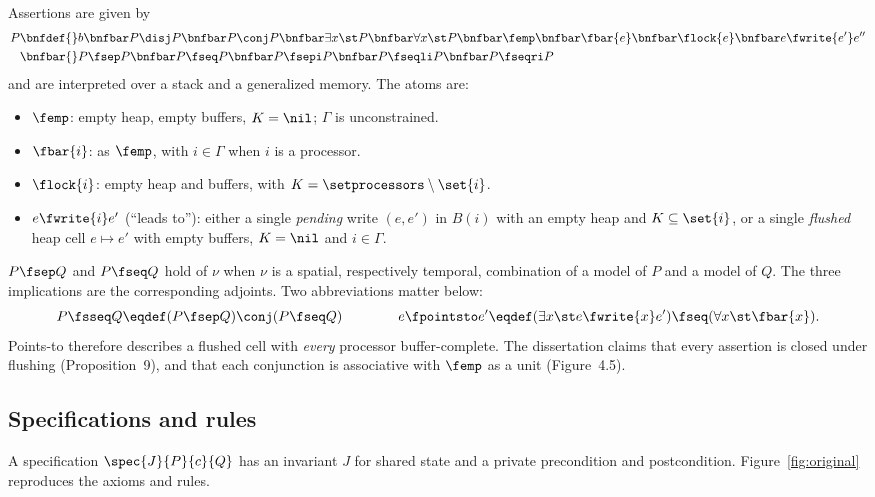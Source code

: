Assertions are given by
\begin{align*}
  P \bnfdef{} & b \bnfbar P \disj P \bnfbar P \conj P \bnfbar \exists x \st P
    \bnfbar \forall x \st P \bnfbar \femp \bnfbar \fbar{e} \bnfbar
    \flock{e} \bnfbar e \fwrite{e'} e'' \\
  \bnfbar{} & P \fsep P \bnfbar P \fseq P \bnfbar P \fsepi P \bnfbar
    P \fseqli P \bnfbar P \fseqri P
\end{align*}
and are interpreted over a stack and a generalized memory. The atoms are:
\begin{itemize}[nosep]
  \item $\femp$: empty heap, empty buffers, $K = \nil$; $\Gamma$ is
        unconstrained.
  \item $\fbar{i}$: as $\femp$, with $i \in \Gamma$ when $i$ is a processor.
  \item $\flock{i}$: empty heap and buffers, with
        $K = \setprocessors \setminus \set{i}$.
  \item $e \fwrite{i} e'$ (``leads to''): either a single \emph{pending}
        write $(e,e')$ in $B(i)$ with an empty heap and
        $K \subseteq \set{i}$, or a single \emph{flushed} heap cell
        $e \mapsto e'$ with empty buffers, $K = \nil$ and $i \in \Gamma$.
\end{itemize}
$P \fsep Q$ and $P \fseq Q$ hold of $\nu$ when $\nu$ is a spatial,
respectively temporal, combination of a model of $P$ and a model of $Q$.
The three implications are the corresponding adjoints. Two abbreviations
matter below:
\[
  P \fsseq Q \eqdef (P \fsep Q) \conj (P \fseq Q)
  \qquad\qquad
  e \fpointsto e' \eqdef (\exists x \st e \fwrite{x} e') \fseq
                         (\forall x \st \fbar{x}).
\]
Points-to therefore describes a flushed cell with \emph{every} processor
buffer-complete. The dissertation claims that every assertion is closed
under flushing (Proposition~9), and that each conjunction is associative
with $\femp$ as a unit (Figure~4.5).

\subsection{Specifications and rules}

A specification $\spec{J}{P}{c}{Q}$ has an invariant $J$ for shared state
and a private precondition and postcondition. Figure~\ref{fig:original}
reproduces the axioms and rules.

